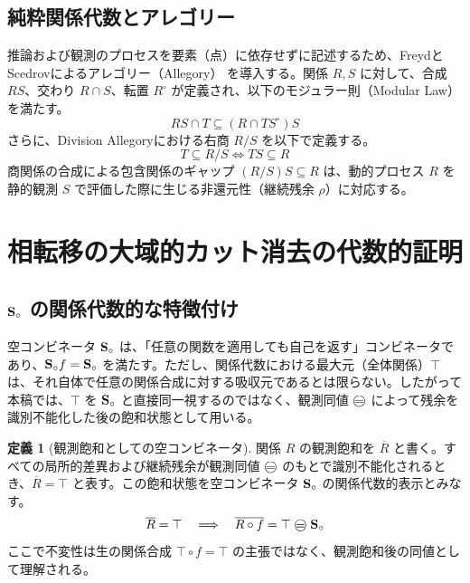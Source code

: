 \documentclass[11pt,a4paper]{ltjsarticle}
\theoremstyle{definition}
\newtheorem{definition}{定義}[section]
\begin{document}
\subsection{純粋関係代数とアレゴリー}
推論および観測のプロセスを要素（点）に依存せずに記述するため、FreydとScedrovによるアレゴリー（Allegory）\cite{Freyd1990} を導入する。関係 $R, S$ に対して、合成 $RS$、交わり $R \cap S$、転置 $R^\circ$ が定義され、以下のモジュラー則（Modular Law）を満たす。
\begin{equation}
RS \cap T \subseteq (R \cap TS^\circ)S
\end{equation}
さらに、Division Allegoryにおける右商 $R/S$ を以下で定義する。
\begin{equation}
T \subseteq R/S \iff TS \subseteq R
\end{equation}
商関係の合成による包含関係のギャップ $(R/S)S \subseteq R$ は、動的プロセス $R$ を静的観測 $S$ で評価した際に生じる非還元性（継続残余 $\rho$）に対応する。

\section{相転移の大域的カット消去の代数的証明}

\subsection{$\mathbf{S}_{\circ}$ の関係代数的な特徴付け}
空コンビネータ $\mathbf{S}_{\circ}$ は、「任意の関数を適用しても自己を返す」コンビネータであり、$\mathbf{S}_{\circ} f = \mathbf{S}_{\circ}$ を満たす。ただし、関係代数における最大元（全体関係）$\top$ は、それ自体で任意の関係合成に対する吸収元であるとは限らない。したがって本稿では、$\top$ を $\mathbf{S}_{\circ}$ と直接同一視するのではなく、観測同値 $\mweq$ によって残余を識別不能化した後の飽和状態として用いる。
\begin{definition}[観測飽和としての空コンビネータ]
関係 $R$ の観測飽和を $\overline{R}$ と書く。すべての局所的差異および継続残余が観測同値 $\mweq$ のもとで識別不能化されるとき、$\overline{R}=\top$ と表す。この飽和状態を空コンビネータ $\mathbf{S}_{\circ}$ の関係代数的表示とみなす。
\begin{equation}
\overline{R}=\top \quad \Longrightarrow \quad \overline{R \circ f}=\top \mweq \Svoid
\end{equation}
ここで不変性は生の関係合成 $\top \circ f=\top$ の主張ではなく、観測飽和後の同値として理解される。
\end{definition}
\end{document}
